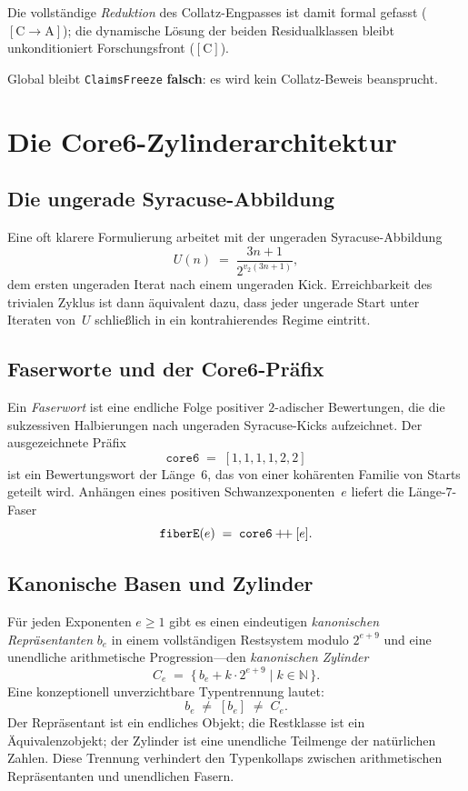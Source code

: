 \documentclass[11pt,a4paper]{article}
\theoremstyle{definition}
\theoremstyle{remark}
\newcommand{\CA}{\ensuremath{[\mathrm{C}\!\to\!\mathrm{A}]}}
\newcommand{\tagC}{\ensuremath{[\mathrm{C}]}}
\newcommand{\Umap}{U}
\newcommand{\N}{\mathbb{N}}
\begin{document}
Die vollständige \emph{Reduktion} des Collatz-Engpasses ist damit formal
gefasst (\CA); die dynamische Lösung der beiden Residualklassen bleibt
unkonditioniert Forschungsfront (\tagC).

Global bleibt \texttt{ClaimsFreeze} \textbf{falsch}: es wird kein Collatz-Beweis
beansprucht.

\section{Die Core6-Zylinderarchitektur}

\subsection{Die ungerade Syracuse-Abbildung}

Eine oft klarere Formulierung arbeitet mit der ungeraden Syracuse-Abbildung
\[
  \Umap(n)
  \;=\;
  \frac{3n+1}{2^{v_2(3n+1)}},
\]
dem ersten ungeraden Iterat nach einem ungeraden Kick. Erreichbarkeit des
trivialen Zyklus ist dann äquivalent dazu, dass jeder ungerade Start unter
Iteraten von~$\Umap$ schließlich in ein kontrahierendes Regime eintritt.

\subsection{Faserworte und der Core6-Präfix}

Ein \emph{Faserwort} ist eine endliche Folge positiver $2$-adischer
Bewertungen, die die sukzessiven Halbierungen nach ungeraden Syracuse-Kicks
aufzeichnet. Der ausgezeichnete Präfix
\[
  \mathtt{core6}
  \;=\;
  [1,1,1,1,2,2]
\]
ist ein Bewertungswort der Länge~$6$, das von einer kohärenten Familie von
Starts geteilt wird. Anhängen eines positiven Schwanzexponenten~$e$ liefert
die Länge-$7$-Faser
\[
  \mathtt{fiberE}(e)
  \;=\;
  \mathtt{core6}\mathbin{+\kern-0.15em+}[e].
\]

\subsection{Kanonische Basen und Zylinder}

Für jeden Exponenten $e\ge 1$ gibt es einen eindeutigen
\emph{kanonischen Repräsentanten} $b_e$ in einem vollständigen
Restsystem modulo $2^{e+9}$ und eine unendliche arithmetische Progression---den
\emph{kanonischen Zylinder}
\[
  C_e
  \;=\;
  \bigl\{\, b_e + k\cdot 2^{e+9}
  \;\big|\;
  k\in\N \,\bigr\}.
\]
Eine konzeptionell unverzichtbare Typentrennung lautet:
\[
  b_e
  \;\neq\;
  [b_e]
  \;\neq\;
  C_e.
\]
Der Repräsentant ist ein endliches Objekt; die Restklasse ist ein
Äquivalenzobjekt; der Zylinder ist eine unendliche Teilmenge der natürlichen
Zahlen. Diese Trennung verhindert den Typenkollaps zwischen
arithmetischen Repräsentanten und unendlichen Fasern.
\end{document}

